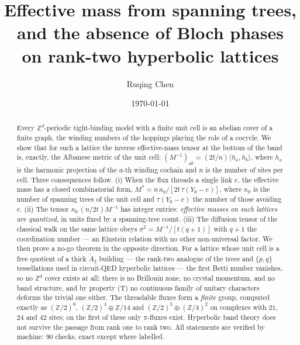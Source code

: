\documentclass[aps,prb,reprint,amsmath,amssymb,floatfix,superscriptaddress]{revtex4-2}
\theoremstyle{plain}
\theoremstyle{definition}
\theoremstyle{remark}
\newcommand{\Z}{\mathbb{Z}}
\newcommand{\Atwo}{\widetilde A_2}
\begin{document}
\title{Effective mass from spanning trees, and the absence of Bloch phases\\
on rank-two hyperbolic lattices}

\author{Ruqing Chen}

\date{\today}

\begin{abstract}
Every $\Z^{d}$-periodic tight-binding model with a finite unit cell is an abelian cover of a
finite graph, the winding numbers of the hoppings playing the role of a cocycle. We show
that for such a lattice the inverse effective-mass tensor at the bottom of the band is,
exactly, the Albanese metric of the unit cell: $(M^{-1})_{ab}=(2t/n)\langle
h_a,h_b\rangle$, where $h_a$ is the harmonic projection of the $a$-th winding cochain and
$n$ is the number of sites per cell. Three consequences follow. (i) When the flux threads a
single link $e$, the effective mass has a closed combinatorial form,
$M^{*}=n\,\kappa_0/[2t\,\tau(Y_0\!-\!e)]$, where $\kappa_0$ is the number of spanning trees
of the unit cell and $\tau(Y_0\!-\!e)$ the number of those avoiding $e$. (ii) The tensor
$\kappa_0\,(n/2t)M^{-1}$ has integer entries: \emph{effective masses on such lattices are
quantized}, in units fixed by a spanning-tree count. (iii) The diffusion tensor of the
classical walk on the same lattice obeys $\sigma^{2}=M^{-1}/[t(q{+}1)]$ with $q+1$ the
coordination number --- an Einstein relation with no other non-universal factor. We then
prove a no-go theorem in the opposite direction. For a lattice whose unit cell is a free
quotient of a thick $\Atwo$ building --- the rank-two analogue of the trees and $\{p,q\}$
tessellations used in circuit-QED hyperbolic lattices --- the first Betti number vanishes,
so no $\Z^{d}$ cover exists at all: there is no Brillouin zone, no crystal momentum, and no
band structure, and by property (T) no continuous family of unitary characters deforms the
trivial one either. The threadable fluxes form a \emph{finite} group, computed exactly as
$(\Z/2)^{6}$, $(\Z/2)^{4}\oplus\Z/14$ and $(\Z/2)^{3}\oplus(\Z/4)^{2}$ on complexes with
$21$, $24$ and $42$ sites; on the first of these only $\pi$-fluxes exist. Hyperbolic band
theory does not survive the passage from rank one to rank two. All statements are verified
by machine: $90$ checks, exact except where labelled.
\end{abstract}

\maketitle
\end{document}
